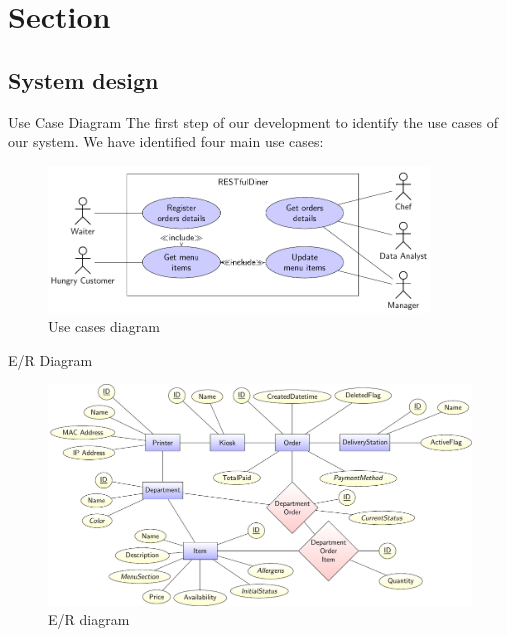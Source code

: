

\section[Section]{Section}

\subsection[System design]{System design}

\begin{frame}{Use Case Diagram}
	The first step of our development to identify the use cases of our system.
	We have identified four main use cases:

	\begin{figure}[h!]
		\centering
		\includegraphics[width=0.9\textwidth,height=0.75\textheight,keepaspectratio]{images/usecases}
		\caption{Use cases diagram}
		\label{fig:usecases}
	\end{figure}

\end{frame}

\begin{frame}{E/R Diagram}
	\begin{figure}[h!]
		\centering
		\includegraphics[width=\textwidth,height=0.75\textheight,keepaspectratio]{images/er}
		\caption{E/R diagram}
		\label{fig:er}
	\end{figure}

\end{frame}

